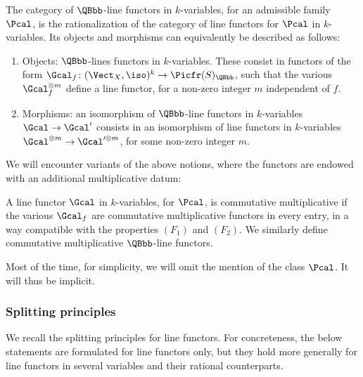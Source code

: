 \begin{definition}
The category of $\QBbb$-line functors in $k$-variables, for an admissible family $\Pcal$, is the rationalization of the category of line functors for $\Pcal$ in $k$-variables. Its objects and morphisms can equivalently be described as follows:
\begin{enumerate}
\item Objects: $\QBbb$-lines functors in $k$-variables. These consist in functors of the form $\Gcal_{f} \colon (\Vect_{X}, \iso)^{k} \to \Picfr(S)_{\QBbb}$, such that the various $\Gcal_{f}^{\otimes m}$ define a line functor, for a non-zero integer $m$ independent of $f$.
\item Morphisms: an isomorphism of $\QBbb$-line functors in $k$-variables $\Gcal\to\Gcal^{\prime}$ consists in an isomorphism of line functors in $k$-variables $\Gcal^{\otimes m}\to\Gcal^{\prime\otimes m}$, for some non-zero integer $m$.
\end{enumerate}
\end{definition}

We will encounter variants of the above notions, where the functors are endowed with an additional multiplicative datum:

\begin{definition}
A line functor $\Gcal$ in $k$-variables, for $\Pcal$, is commutative multiplicative if the various $\Gcal_{f}$ are commutative multiplicative functors in every entry, in a way compatible with the properties $(F_{1})$ and $(F_{2})$. We similarly define commutative multiplicative $\QBbb$-line functors.
\end{definition}
Most of the time, for simplicity, we will omit the mention of the class $\Pcal$. It will thus be implicit.

\subsubsection{Splitting principles}\label{subsubsec:splitting-principle}
We recall the splitting principles for line functors. For concreteness, the below statements are formulated for line functors only, but they hold more generally for line functors in several variables and their rational counterparts.

